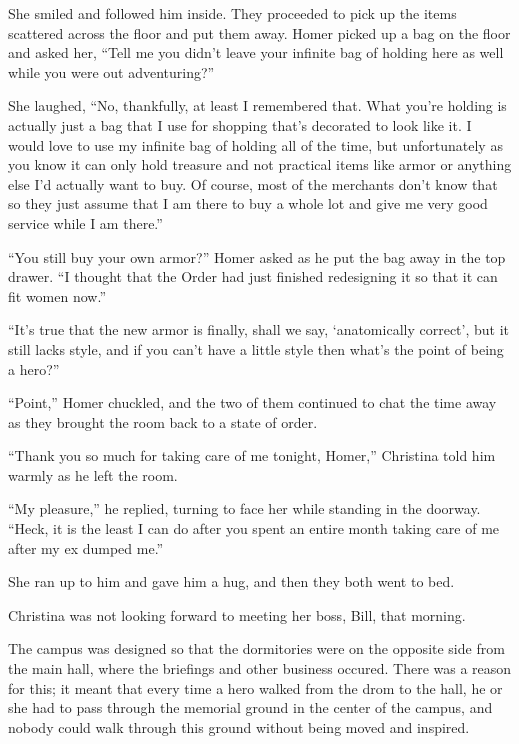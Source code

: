 \documentclass[showtrims,b6paper,draft,10pt]{memoir}
\begin{document}
She smiled and followed him inside.  They proceeded to pick up the items scattered across the floor and put them away.  Homer picked up a bag on the floor and asked her,  ``Tell me you didn't leave your infinite bag of holding here as well while you were out adventuring?''

She laughed, ``No, thankfully, at least I remembered that.  What you're holding is actually just a bag that I use for shopping that's decorated to look like it.  I would love to use my infinite bag of holding all of the time, but unfortunately as you know it can only hold treasure and not practical items like armor or anything else I'd actually want to buy.  Of course, most of the merchants don't know that so they just assume that I am there to buy a whole lot and give me very good service while I am there.''

``You still buy your own armor?'' Homer asked as he put the bag away in the top drawer.  ``I thought that the Order had just finished redesigning it so that it can fit women now.''

``It's true that the new armor is finally, shall we say, `anatomically correct', but it still lacks style, and if you can't have a little style then what's the point of being a hero?''

``Point,'' Homer chuckled, and the two of them continued to chat the time away as they brought the room back to a state of order.

``Thank you so much for taking care of me tonight, Homer,''  Christina told him warmly as he left the room.

``My pleasure,'' he replied, turning to face her while standing in the doorway.  ``Heck, it is the least I can do after you spent an entire month taking care of me after my ex dumped me.''

She ran up to him and gave him a hug, and then they both went to bed.

\timeskip

Christina was not looking forward to meeting her boss, Bill, that morning.

The campus was designed so that the dormitories were on the opposite side from the main hall, where the briefings and other business occured.  There was a reason for this;  it meant that every time a hero walked from the drom to the hall, he or she had to pass through the memorial ground in the center of the campus, and nobody could walk through this ground without being moved and inspired.
\end{document}
